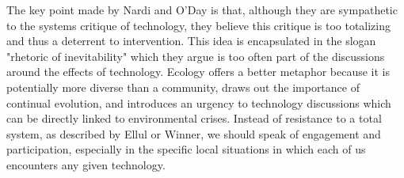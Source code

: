 The key point made by Nardi and O'Day is that, although they are sympathetic to the systems critique of technology, they believe this critique is too totalizing and thus a deterrent to intervention. This idea is encapsulated in the slogan "rhetoric of inevitability" which they argue is too often part of the discussions around the effects of technology. Ecology offers a better metaphor because it is potentially more diverse than a community, draws out the importance of continual evolution, and introduces an urgency to technology discussions which can be directly linked to environmental crises. Instead of resistance to a total system, as described by Ellul or Winner, we should speak of engagement and participation, especially in the specific local situations in which each of us encounters any given technology.